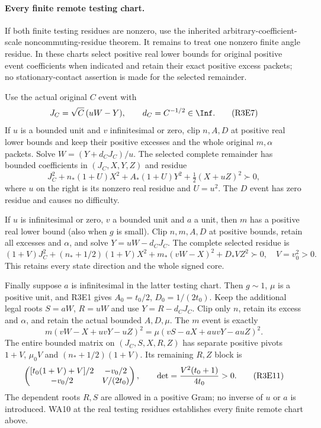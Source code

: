 \paragraph{Every finite remote testing chart.}
If both finite testing residues are nonzero, use the inherited
arbitrary-coefficient-scale noncommuting-residue theorem. It remains
to treat one nonzero finite angle residue. In these charts select
positive real lower bounds for original positive event coefficients
when indicated and retain their exact positive excess packets;
no stationary-contact assertion is made for the selected remainder.

Use the actual original $C$ event with
\[
       J_C=\sqrt C\,(uW-Y),\qquad d_C=C^{-1/2}\in\Inf.
                                                               \tag{R3E7}
\]
If $u$ is a bounded unit and $v$ infinitesimal or zero, clip $n,A,D$
at positive real lower bounds and keep their positive excesses and
the whole original $m,\alpha$ packets. Solve
$W=(Y+d_CJ_C)/u$. The selected complete remainder has bounded
coefficients in $(J_C,X,Y,Z)$ and residue
\[
 J_C^2+n_*(1+U)X^2+A_*(1+U)Y^2
                         +\tfrac12(X+uZ)^2\succ0,               \tag{R3E8}
\]
where $u$ on the right is its nonzero real residue and $U=u^2$.
The $D$ event has zero residue and causes no difficulty.

If $u$ is infinitesimal or zero, $v$ a bounded unit and $a$ a unit,
then $m$ has a positive real lower bound (also when $g$ is small).
Clip $n,m,A,D$ at positive bounds, retain all excesses and $\alpha$,
and solve $Y=uW-d_CJ_C$. The complete selected residue is
\[
 (1+V)J_C^2+(n_*+1/2)(1+V)X^2
       +m_*(vW-X)^2+D_*VZ^2\succ0,\quad V=v_0^2>0.              \tag{R3E9}
\]
This retains every state direction and the whole signed core.

Finally suppose $a$ is infinitesimal in the latter testing chart.
Then $g\sim1$, $\mu$ is a positive unit, and R3E1 gives
$A_0=t_0/2$, $D_0=1/(2t_0)$. Keep the additional legal roots
$S=aW$, $R=uW$ and use $Y=R-d_CJ_C$. Clip only $n$, retain its
excess and $\alpha$, and retain the actual bounded $A,D,\mu$.
The $m$ event is exactly
\[
 m(vW-X+uvY-uZ)^2
       =\mu(vS-aX+auvY-auZ)^2.                    \tag{R3E10}
\]
The entire bounded matrix on $(J_C,S,X,R,Z)$ has separate
positive pivots $1+V$, $\mu_0V$ and $(n_*+1/2)(1+V)$.
Its remaining $R,Z$ block is
\[
 \begin{pmatrix}
 [t_0(1+V)+V]/2&-v_0/2\\
 -v_0/2&V/(2t_0)
 \end{pmatrix},\qquad
 \det={V^2(t_0+1)\over4t_0}>0.                    \tag{R3E11}
\]
The dependent roots $R,S$ are allowed in a positive Gram; no inverse
of $u$ or $a$ is introduced. WA10 at the real testing residues
establishes every finite remote chart above.

